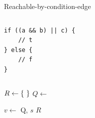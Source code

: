 \documentclass[xcolor = {dvipsnames, table}]{beamer}
\begin{document}
\newcommand{\includegraph}[2]{%
    \includegraphics<#1>[
        width  = \linewidth,
        height = \textheight,
        keepaspectratio,
    ]{graph/#2.pdf}
}

\begin{frame}
    Reachable-by-condition-edge
\end{frame}

\begin{frame}[fragile]
    \begin{columns}
        \begin{column}{0.4\textwidth}
            \begin{lstlisting}[basicstyle = \footnotesize\ttfamily]
if ((a && b) || c) {
    // t
} else {
    // f
}
            \end{lstlisting}
        \end{column}

    \end{columns}
\end{frame}

\begin{frame}
    \begin{algorithmic}[1]
            \State $R \gets \set{}$
            \State $Q \gets$ 

            \Repeat
                \State $v \gets$ 
                    \State {} {Q, $s$}
                    \State {}
                \EndFor
            \State \Return $R$
        \EndFunction
    \end{algorithmic}
\end{frame}
\end{document}

